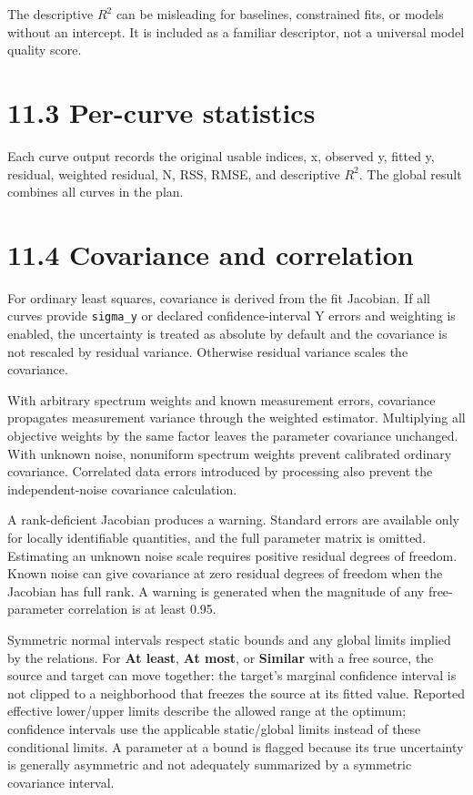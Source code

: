 \documentclass[
  10pt,
  a4paper,
  oneside]{scrreprt}
\begin{document}
The descriptive \(R^2\) can be misleading for baselines, constrained
fits, or models without an intercept. It is included as a familiar
descriptor, not a universal model quality score.

\hypertarget{per-curve-statistics}{%
\section{11.3 Per-curve statistics}\label{per-curve-statistics}}

Each curve output records the original usable indices, x, observed y,
fitted y, residual, weighted residual, N, RSS, RMSE, and descriptive
\(R^2\). The global result combines all curves in the plan.

\hypertarget{covariance-and-correlation}{%
\section{11.4 Covariance and
correlation}\label{covariance-and-correlation}}

For ordinary least squares, covariance is derived from the fit Jacobian.
If all curves provide \texttt{sigma\_y} or declared confidence-interval
Y errors and weighting is enabled, the uncertainty is treated as
absolute by default and the covariance is not rescaled by residual
variance. Otherwise residual variance scales the covariance.

With arbitrary spectrum weights and known measurement errors, covariance
propagates measurement variance through the weighted estimator.
Multiplying all objective weights by the same factor leaves the
parameter covariance unchanged. With unknown noise, nonuniform spectrum
weights prevent calibrated ordinary covariance. Correlated data errors
introduced by processing also prevent the independent-noise covariance
calculation.

A rank-deficient Jacobian produces a warning. Standard errors are
available only for locally identifiable quantities, and the full
parameter matrix is omitted. Estimating an unknown noise scale requires
positive residual degrees of freedom. Known noise can give covariance at
zero residual degrees of freedom when the Jacobian has full rank. A
warning is generated when the magnitude of any free-parameter
correlation is at least 0.95.

Symmetric normal intervals respect static bounds and any global limits
implied by the relations. For \textbf{At least}, \textbf{At most}, or
\textbf{Similar} with a free source, the source and target can move
together: the target's marginal confidence interval is not clipped to a
neighborhood that freezes the source at its fitted value. Reported
effective lower/upper limits describe the allowed range at the optimum;
confidence intervals use the applicable static/global limits instead of
these conditional limits. A parameter at a bound is flagged because its
true uncertainty is generally asymmetric and not adequately summarized
by a symmetric covariance interval.
\end{document}
